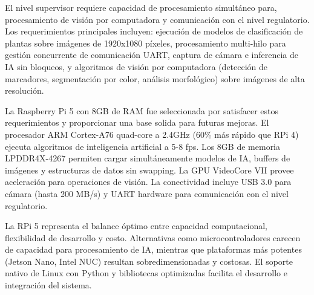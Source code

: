 El nivel supervisor requiere capacidad de procesamiento simultáneo para, procesamiento de visión por computadora y comunicación con el nivel regulatorio. Los requerimientos principales incluyen: ejecución de modelos de clasificación de plantas sobre imágenes de 1920x1080 píxeles, procesamiento multi-hilo para gestión concurrente de comunicación UART, captura de cámara e inferencia de IA sin bloqueos, y algoritmos de visión por computadora (detección de marcadores, segmentación por color, análisis morfológico) sobre imágenes de alta resolución.

La Raspberry Pi 5 con 8GB de RAM fue seleccionada por satisfacer estos requerimientos y proporcionar una base solida para futuras mejoras. El procesador ARM Cortex-A76 quad-core a 2.4GHz (60\% más rápido que RPi 4) ejecuta algoritmos de inteligencia artificial a 5-8 fps. Los 8GB de memoria LPDDR4X-4267 permiten cargar simultáneamente modelos de IA, buffers de imágenes y estructuras de datos sin swapping. La GPU VideoCore VII provee aceleración para operaciones de visión. La conectividad incluye USB 3.0 para cámara (hasta 200 MB/s) y UART hardware para comunicación con el nivel regulatorio. 

La RPi 5 representa el balance óptimo entre capacidad computacional, flexibilidad de desarrollo y costo. Alternativas como microcontroladores carecen de capacidad para procesamiento de IA, mientras que plataformas más potentes (Jetson Nano, Intel NUC) resultan sobredimensionadas y costosas. El soporte nativo de Linux con Python y bibliotecas optimizadas facilita el desarrollo e integración del sistema.
